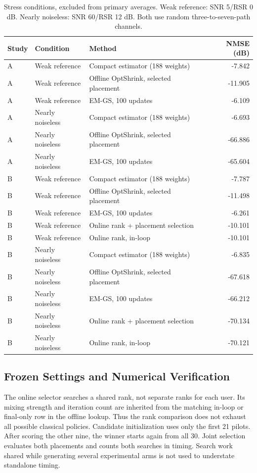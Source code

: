 \begin{table}[!t]
\caption{Stress conditions, excluded from primary averages. Weak reference: SNR 5/RSR 0 dB. Nearly noiseless: SNR 60/RSR 12 dB. Both use random three-to-seven-path channels.}
\label{tab:broad-stress}\centering\footnotesize
\setlength{\tabcolsep}{4pt}
\begin{tabular}{@{}lllr@{}}\toprule
Study & Condition & Method & NMSE (dB)\\
\midrule
A & Weak reference & Compact estimator (188 weights) & -7.842\\
A & Weak reference & Offline OptShrink, selected placement & -11.905\\
A & Weak reference & EM-GS, 100 updates & -6.109\\
A & Nearly noiseless & Compact estimator (188 weights) & -6.693\\
A & Nearly noiseless & Offline OptShrink, selected placement & -66.886\\
A & Nearly noiseless & EM-GS, 100 updates & -65.604\\
B & Weak reference & Compact estimator (188 weights) & -7.787\\
B & Weak reference & Offline OptShrink, selected placement & -11.498\\
B & Weak reference & EM-GS, 100 updates & -6.261\\
B & Weak reference & Online rank + placement selection & -10.101\\
B & Weak reference & Online rank, in-loop & -10.101\\
B & Nearly noiseless & Compact estimator (188 weights) & -6.835\\
B & Nearly noiseless & Offline OptShrink, selected placement & -67.618\\
B & Nearly noiseless & EM-GS, 100 updates & -66.212\\
B & Nearly noiseless & Online rank + placement selection & -70.134\\
B & Nearly noiseless & Online rank, in-loop & -70.121\\
\bottomrule
\end{tabular}
\end{table}


\subsection{Frozen Settings and Numerical Verification}

The online selector searches a shared rank, not separate ranks for each user. Its mixing strength and iteration count are inherited from the matching in-loop or final-only row in the offline lookup. Thus the rank comparison does not exhaust all possible classical policies. Candidate initialization uses only the first 21 pilots. After scoring the other nine, the winner starts again from all 30. Joint selection evaluates both placements and counts both searches in timing. Search work shared while generating several experimental arms is not used to understate standalone timing.

